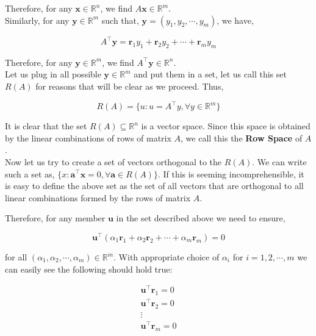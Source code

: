 \documentclass[a4paper]{article}
\begin{document}
Therefore, for any $\boldsymbol{x} \in \mathbb{R}^n$, we find $A\boldsymbol{x} \in \mathbb{R}^m$.\\

Similarly, for any $\boldsymbol{y} \in \mathbb{R}^{m}$ such that, $\boldsymbol{y} = \left( y_1, y_2, \cdots, y_m \right)$, we have,

\begin{equation}
A^{\top}\boldsymbol{y} = \boldsymbol{r}_1 y_1 + \boldsymbol{r}_2 y_2 + \cdots + \boldsymbol{r}_m y_m
\end{equation}

Therefore, for any $\boldsymbol{y} \in \mathbb{R}^m$, we find $A^{\top}\boldsymbol{y} \in \mathbb{R}^n$.\\

Let us plug in all possible $\boldsymbol{y} \in \mathbb{R}^m$ and put them in a set, let us call this set $R(A)$ for reasons that will be clear as we proceed. Thus,

\begin{equation}
R(A) = \{ u : u = A^{\top}y, \forall y \in \mathbb{R}^m  \}
\end{equation}

It is clear that the set $R(A) \subseteq \mathbb{R}^n$ is a vector space. Since this space is obtained by the linear combinations of rows of matrix $A$, we call this the \textbf{Row Space} of $A$.\\

Now let us try to create a set of vectors orthogonal to the $R(A)$. We can write such a set as,
$\{ x: \boldsymbol{a}^{\top}\boldsymbol{x} = 0, \forall \boldsymbol{a} \in R(A) \}$. If this is seeming incomprehensible, it is easy to define the above set as the set of all vectors that are orthogonal to all linear combinations formed by the rows of matrix $A$.

Therefore, for any member $\boldsymbol{u}$ in the set described above we need to ensure,

\begin{equation}
\boldsymbol{u}^{\top}\left( \alpha_1 \boldsymbol{r}_1 + \alpha_2 \boldsymbol{r}_2 + \cdots + \alpha_m \boldsymbol{r}_m \right) = 0
\end{equation}

for all $\left( \alpha_1, \alpha_2, \cdots, \alpha_m \right) \in \mathbb{R}^m$. With appropriate choice of $\alpha_i$ for $i=1,2,\cdots,m$ we can easily see the following should hold true:

\begin{eqnarray}
\boldsymbol{u}^{\top}\boldsymbol{r}_1 = 0 \\
\boldsymbol{u}^{\top}\boldsymbol{r}_2 = 0 \\
\vdots\\
\boldsymbol{u}^{\top}\boldsymbol{r}_m = 0
\end{eqnarray}
\end{document}
